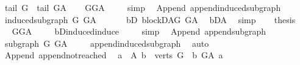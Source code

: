 \begin{isabellebody}
\ \ {\isachardoublequoteopen}tail\ G\ {\isacharequal}{\kern0pt}\ tail\ G{\isacharunderscore}{\kern0pt}A{\isachardoublequoteclose}\isanewline
%
\isadelimproof
\ \ %
\endisadelimproof
%
\isatagproof
{}\isamarkupfalse%
\ GG{\isacharunderscore}{\kern0pt}A\ \isanewline
\ \ \isamarkupfalse%
\ simp%
\endisatagproof
{\isafoldproof}%
%
\isadelimproof
\isanewline
%
\endisadelimproof
\isanewline
\isanewline
\isanewline
{}\isamarkupfalse%
\ {\isacharparenleft}{\kern0pt}\ Append{\isacharparenright}{\kern0pt}\ append{\isacharunderscore}{\kern0pt}induced{\isacharunderscore}{\kern0pt}subgraph{\isacharcolon}{\kern0pt}\ \isanewline
\ \ {\isachardoublequoteopen}induced{\isacharunderscore}{\kern0pt}subgraph\ G\ G{\isacharunderscore}{\kern0pt}A\ {\isachardoublequoteclose}\isanewline
%
\isadelimproof
%
\endisadelimproof
%
\isatagproof
{}\isamarkupfalse%
\ {\isacharminus}{\kern0pt}\isanewline
\ \ \isamarkupfalse%
\ bD{}{\isacharcolon}{\kern0pt}\ blockDAG\ G{\isacharunderscore}{\kern0pt}A\ \isamarkupfalse%
\ bD{\isacharunderscore}{\kern0pt}A\ \isamarkupfalse%
\ simp\isanewline
\ \ \isamarkupfalse%
\ {\isacharquery}{\kern0pt}thesis\ \isanewline
\ \ \isamarkupfalse%
\ GG{\isacharunderscore}{\kern0pt}A\ \isanewline
\ \ \isamarkupfalse%
\ bD{}{\isachardot}{\kern0pt}induced{\isacharunderscore}{\kern0pt}induce\ \isanewline
\ \ \isamarkupfalse%
\ simp\isanewline
{}\isamarkupfalse%
%
\endisatagproof
{\isafoldproof}%
%
\isadelimproof
\isanewline
%
\endisadelimproof
\isanewline
\isanewline
{}\isamarkupfalse%
\ {\isacharparenleft}{\kern0pt}\ Append{\isacharparenright}{\kern0pt}\ append{\isacharunderscore}{\kern0pt}subgraph{\isacharcolon}{\kern0pt}\ \isanewline
\ \ {\isachardoublequoteopen}subgraph\ G\ G{\isacharunderscore}{\kern0pt}A\ {\isachardoublequoteclose}\isanewline
%
\isadelimproof
\ \ %
\endisadelimproof
%
\isatagproof
{}\isamarkupfalse%
\ append{\isacharunderscore}{\kern0pt}induced{\isacharunderscore}{\kern0pt}subgraph\ \isamarkupfalse%
\ auto%
\endisatagproof
{\isafoldproof}%
%
\isadelimproof
\isanewline
%
\endisadelimproof
\isanewline
\isanewline
{}\isamarkupfalse%
\ {\isacharparenleft}{\kern0pt}\ Append{\isacharparenright}{\kern0pt}\ append{\isacharunderscore}{\kern0pt}not{\isacharunderscore}{\kern0pt}reached{\isacharcolon}{\kern0pt}\isanewline
\ \ {\isachardoublequoteopen}{\isasymforall}a\ {\isasymin}\ A{\isachardot}{\kern0pt}\ {\isasymforall}b\ {\isasymin}\ verts\ G{\isachardot}{\kern0pt}\ {\isasymnot}\ b\ {\isasymrightarrow}\isactrlsup {\isacharplus}{\kern0pt}\isactrlbsub G{\isacharunderscore}{\kern0pt}A\isactrlesub \ a{\isachardoublequoteclose}\isanewline

\end{isabellebody}
